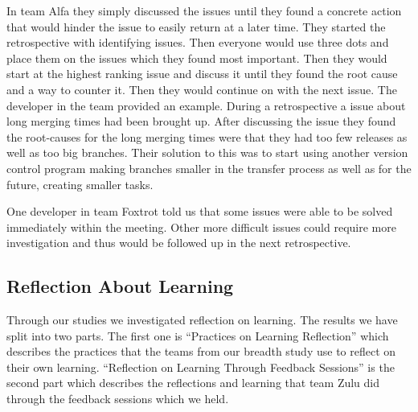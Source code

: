 In team Alfa they simply discussed the issues until they found a concrete action that would hinder the issue to easily return at a later time. They started the retrospective with identifying issues. Then everyone would use three dots and place them on the issues which they found most important. Then they would start at the highest ranking issue and discuss it until they found the root cause and a way to counter it. Then they would continue on with the next issue. The developer in the team provided an example. During a retrospective a issue about long merging times had been brought up. After discussing the issue they found the root-causes for the long merging times were that they had too few releases as well as too big branches. Their solution to this was to start using another version control program making branches smaller in the transfer process as well as for the future, creating smaller tasks. 

One developer in team Foxtrot told us that some issues were able to be solved immediately within the meeting. Other more difficult issues could require more investigation and thus would be followed up in the next retrospective. 

\begin{table}[!h]
	\begin{center}
	\caption{Root-Cause identifying techniques used.}
	\label{table:root-cause-technique}
	\end{center}
\end{table}

\subsection{Reflection About Learning}
Through our studies we investigated reflection on learning. The results we have split into two parts. The first one is ``Practices on Learning Reflection'' which describes the practices that the teams from our breadth study use to reflect on their own learning. ``Reflection on Learning Through Feedback Sessions'' is the second part which describes the reflections and learning that team Zulu did through the feedback sessions which we held. 


